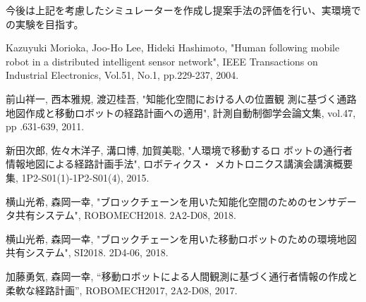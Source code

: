 \documentclass{jsarticle}
\begin{document}
今後は上記を考慮したシミュレーターを作成し提案手法の評価を行い、実環境での実験を目指す。


\footnotesize
\begin{thebibliography}{99}

Kazuyuki Morioka, Joo-Ho Lee, Hideki Hashimoto, "Human following mobile robot in a distributed intelligent sensor network", IEEE Transactions on Industrial Electronics, Vol.51, No.1, pp.229-237, 2004.

前山祥一, 西本雅規, 渡辺桂吾, "知能化空間における人の位置観 測に基づく通路地図作成と移動ロボットの経路計画への適用", 計測自動制御学会論文集, vol.47, pp .631-639, 2011.

新田次郎, 佐々木洋子, 溝口博, 加賀美聡, "人環境で移動するロ ボットの通行者情報地図による経路計画手法", ロボティクス・ メカトロニクス講演会講演概要集, 1P2-S01(1)-1P2-S01(4), 2015.

横山光希, 森岡一幸, "ブロックチェーンを用いた知能化空間のためのセンサデータ共有システム", ROBOMECH2018. 2A2-D08, 2018.

横山光希, 森岡一幸, "ブロックチェーンを用いた移動ロボットのための環境地図共有システム", SI2018. 2D4-06, 2018.

加藤勇気, 森岡一幸, “移動ロボットによる人間観測に基づく通行者情報の作成と柔軟な経路計画”, ROBOMECH2017, 2A2-D08, 2017.




\end{thebibliography}

\normalsize
\end{document}

